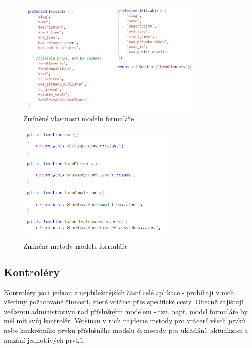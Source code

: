 	\begin{figure}[H]
		\centering
		\includegraphics[width=0.85\textwidth]{img/form_model/vlastnosti.png}
		\caption{Zmíněné vlastnosti modelu formuláře}
		\label{fig:model_vlastnosti}
	\end{figure}
	
	\begin{figure}[H]
		\centering
		\includegraphics[width=0.7\textwidth]{img/form_model/metody.png}
		\caption{Zmíněné metody modelu formuláře}
		\label{fig:model_metody}
	\end{figure}
	
	\subsection{Kontroléry}
    Kontroléry jsou jednou z nejdůležitějších částí celé aplikace - probíhají v nich všechny požadované činnosti, které voláme přes specifické cesty. Obecně zajišťují veškerou administrativu nad příslušným modelem - tzn. např. model formuláře by měl mít svůj kontrolér. Většinou v nich najdeme metody pro vrácení všech prvků nebo konkrétního prvku příslušného modelu či metody pro ukládání, aktualizaci a mazání jednotlivých prvků.
    
